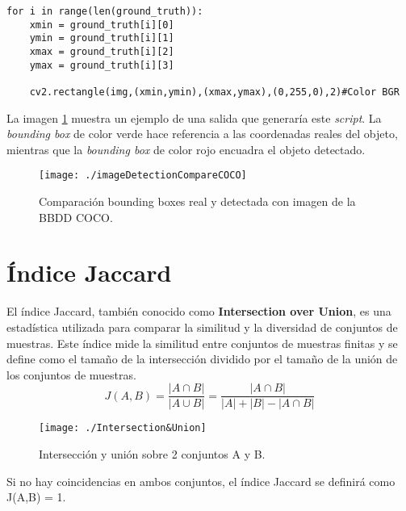\documentclass[a4paper, 12pt, oneside]{book}
\begin{document}
\begin{lstlisting}[frame=single]
for i in range(len(ground_truth)):
	xmin = ground_truth[i][0]
	ymin = ground_truth[i][1]
	xmax = ground_truth[i][2]
	ymax = ground_truth[i][3]

	cv2.rectangle(img,(xmin,ymin),(xmax,ymax),(0,255,0),2)#Color BGR
\end{lstlisting}

La imagen \ref{DetectionCompareCOCO} muestra un ejemplo de una salida que generaría este \textit{script}. La \textit{bounding box} de color verde hace referencia a las coordenadas reales del objeto, mientras que la \textit{bounding box} de color rojo encuadra el objeto detectado.

\begin{figure}[H]
\begin{center}
\texttt{[image: ./imageDetectionCompareCOCO]}
\caption{Comparación bounding boxes real y detectada con imagen de la BBDD COCO.}
\label{DetectionCompareCOCO}
\end{center}
\end{figure}

\section{Índice Jaccard}

El índice Jaccard, también conocido como \textbf{Intersection over Union}, es una estadística utilizada para comparar la similitud y la diversidad de conjuntos de muestras. Este índice mide la similitud entre conjuntos de muestras finitas y se define como el tamaño de la intersección dividido por el tamaño de la unión de los conjuntos de muestras.\\

\begin{equation}
J(A,B) = \frac{|A\cap B|}{|A\cup B|} = \frac{|A\cap B|}{|A| + |B| - |A\cap B|}
\end{equation}

\begin{figure}[H]
\begin{center}
\texttt{[image: ./Intersection\&Union]}
\caption{Intersección y unión sobre 2 conjuntos A y B.}
\end{center}
\end{figure}

Si no hay coincidencias en ambos conjuntos, el índice Jaccard se definirá como J(A,B) = 1.
\end{document}

